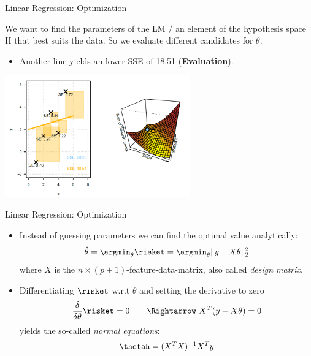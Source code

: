 \begin{frame}{Linear Regression: Optimization}

We want to find the parameters of the LM / an element of the hypothesis
space H that best suits the data. So we evaluate different candidates
for \(\theta\).

\begin{itemize}
\item
  Another line yields an lower SSE of 18.51 (\textbf{Evaluation}).
\end{itemize}

\begin{center}
\includegraphics[width=0.6\textwidth]{plots/lin-reg-optim02.png}
\end{center}

\end{frame}


\begin{frame}{Linear Regression: Optimization}

\begin{itemize}

\item Instead of guessing parameters we can find the optimal value analytically: \[
\hat{\theta} = \argmin_{\theta} \risket = \argmin_{\theta} \|y - X\theta\|^2_2
\]  where \(X\) is the \(n \times (p+1)\)-feature-data-matrix, also called
\emph{design matrix}.

\item Differentiating $\risket $ w.r.t $\theta$  and setting the derivative to zero
\[\frac{\delta}{\delta\theta} \risket = 0
 \qquad \Rightarrow\ 
 X^T(y - X\theta) = 0\]
 yields the so-called \emph{normal equations}:
 $$
\thetah = (X^T X)^{-1} X^T y
$$

\end{itemize}

\end{frame}

